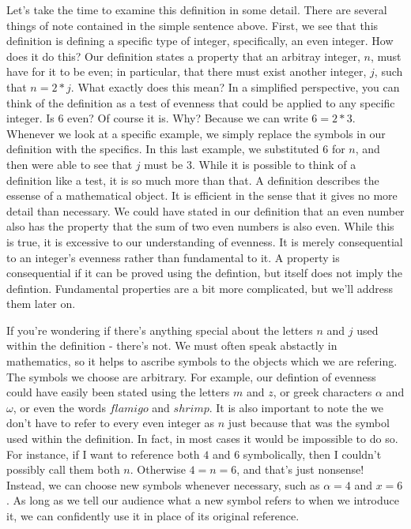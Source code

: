 \documentclass[a4paper,12pt]{article}
\begin{document}
Let's take the time to examine this definition in some detail. There are several things of note contained in the simple sentence above. First, we see that this definition is defining a specific type of integer, specifically, an even integer. How does it do this? Our definition states a property that an arbitray integer, $n$, must have for it to be even; in particular, that there must exist another integer, $j$, such that $n = 2*j$. What exactly does this mean? In a simplified perspective, you can think of the definition as a test of evenness that could be applied to any specific integer. Is $6$ even? Of course it is. Why? Because we can write $6 = 2*3$. Whenever we look at a specific example, we simply replace the symbols in our definition with the specifics. In this last example, we substituted $6$ for $n$, and then were able to see that $j$ must be $3$. While it is possible to think of a definition like a test, it is so much more than that. A definition describes the essense of a mathematical object. It is efficient in the sense that it gives no more detail than necessary. We could have stated in our definition that an even number also has the property that the sum of two even numbers is also even. While this is true, it is excessive to our understanding of evenness. It is merely consequential to an integer's evenness rather than fundamental to it. A property is consequential if it can be proved using the defintion, but itself does not imply the defintion. Fundamental properties are a bit more complicated, but we'll address them later on. 

If you're wondering if there's anything special about the letters $n$ and $j$ used within the definition - there's not. We must often speak abstactly in mathematics, so it helps to ascribe symbols to the objects which we are refering. The symbols we choose are arbitrary. For example, our defintion of evenness could have easily been stated using the letters $m$ and $z$, or greek characters $\alpha$ and $\omega$, or even the words $flamigo$ and $shrimp$. It is also important to note the we don't have to refer to every even integer as $n$ just because that was the symbol used within the definition. In fact, in most cases it would be impossible to do so. For instance, if I want to reference both $4$ and $6$ symbolically, then I couldn't possibly call them both $n$. Otherwise $4 = n = 6$, and that's just nonsense! Instead, we can choose new symbols whenever necessary, such as $\alpha = 4$ and $x = 6$. As long as we tell our audience what a new symbol refers to when we introduce it, we can confidently use it in place of its original reference.  
\end{document}
